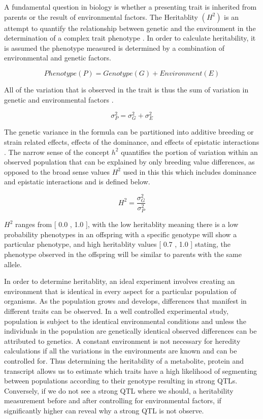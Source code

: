 \documentclass[a4paper]{book}
\begin{document}
	A fundamental question in biology is whether a presenting trait is inherited from parents or the result of environmental factors. 	The Heritablity $(H^2)$ is an attempt to quantify the relationship between genetic and the environment in the determination of a complex trait phenotype \citep{Visscher2008Heritabilitymisconceptions}. In order to calculate heritability, it is assumed the phenotype measured is determined by a combination of environmental and genetic factors. 

\begin{equation} \label{eq1}
Phenotype (P) = Genotype (G) + Environment (E) 
\end{equation}

All of the variation that is observed in the trait is thus the sum of variation in genetic and environmental factors  \citep{Visscher2008Heritabilitymisconceptions}.

\begin{equation} \label{eq2}
 \sigma_P^2 = \sigma_G^2 + \sigma_E^2
\end{equation}
		
The genetic variance in the formula can be partitioned into additive breeding or strain related effects, effects of the dominance, and effects of epistatic interactions \citep{Visscher2008Heritabilitymisconceptions}. The narrow sense of the concept $h^2$ quantifies the portion of variation within an observed population that can be explained by only  breeding value differences, as opposed to the broad sense values $H^2$ used in this this which includes dominance and epistatic interactions and is defined below.
	
\begin{equation} \label{eq3}
H^2 = \dfrac{\sigma_G^2}{\sigma_P^2} 
\end{equation}
	

	$H^2$ ranges from [ 0.0 , 1.0 ], with the low heritablity meaning there is a low probability phenotypes in an offspring with a specific genotype will show a particular phenotype, and high heritablity values [ 0.7 , 1.0 ] stating, the phenotype observed in the offspring will be similar to parents with the same allele.  
	
	In order to determine heritablity, an ideal experiment involves creating an environment that is identical in every aspect for a particular population of organisms. As the population grows and develops, differences that manifest in different traits can be observed. In a well controlled experimental study, population is subject to the identical environmental conditions and unless the individuals in the population are genetically identical observed differences can be attributed to genetics. A constant environment is not necessary for heredity calculations if all the variations in the environments are known and can be controlled for. Thus determining the heritability of a metabolite, protein and transcript allows us to estimate which traits have a high likelihood of segmenting between populations according to their genotype resulting in strong QTLs. Conversely, if we do not see a strong QTL where we should, a heritability measurement before and after controlling for environmental factors, if significantly higher can reveal why a strong QTL is not observe.
	
\end{document}
